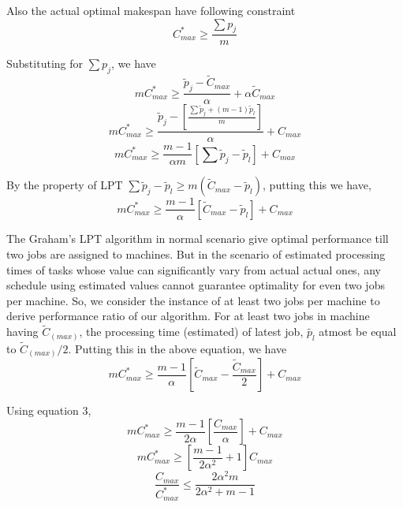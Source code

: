 \documentclass[10pt, conference, compsocconf]{IEEEtran}
\begin{document}
 Also the actual optimal makespan have following constraint
 \begin{equation}\nonumber 
C_{max}^{*}\geq \frac{\sum {p_j}}{m}
\end{equation}

Substituting for  $ \sum {p_j}$, we have
 \begin{equation}\nonumber 
 m C_{max}^{*}\geq \frac{\tilde p_j- \tilde C_{max}}{\alpha} + \alpha \tilde C_{max}
 \end{equation} 
\begin{equation}\nonumber 
 m C_{max}^{*}\geq \frac{\tilde p_j-[\frac{\sum{\tilde p_j + (m-1) \tilde p_l }}{m}]} {\alpha} + {C_{max}}
\end{equation}
\begin{equation}\nonumber
 m C_{max}^{*}\geq \frac{m-1}{\alpha m} [\sum \tilde p_j-\tilde p_l] + {C_{max}}
 \end{equation}

By the property of LPT $\sum \tilde p_j-\tilde p_l \geq m (\tilde C_{max}-\tilde p_l)$, putting this we have,\\
\begin{equation}\nonumber 
 m C_{max}^{*}\geq \frac{m-1}{\alpha } \left[\tilde C_{max}-\tilde p_l\right] + {C_{max}}
 \end{equation}
 
 The Graham’s LPT algorithm in normal scenario give
 optimal performance till two jobs are assigned to machines.
 But in the scenario of estimated processing times
 of tasks whose value can significantly vary from actual
 actual ones, any schedule using estimated values cannot
 guarantee optimality for even two jobs per machine. So,
 we consider the instance of at least two jobs per machine
 to derive performance ratio of our algorithm. For at least
 two jobs in machine having $\tilde{C}_(max)$, the processing time
 (estimated) of latest job, $\tilde{p_l} $ atmost be equal to $\tilde{C}_(max)/2$. Putting this in the above equation, we have
\begin{equation}\nonumber
 m C_{max}^{*}\geq \frac{m-1}{\alpha } \left[\tilde C_{max}-\frac{\tilde C_{max}}{2}\right] + {C_{max}}
\end{equation}

Using equation 3,
\begin{equation}\nonumber
 m C_{max}^{*}\geq \frac{m-1}{2\alpha } \left[\frac{C_{max}} {\alpha} \right]+ {C_{max}}
\end{equation}
\begin{equation}\nonumber
 m C_{max}^{*}\geq \left[\frac{m-1}{2\alpha^{2} } +1\right]{C_{max}}
\end{equation}
\begin{equation}\nonumber
\frac{C_{max}}{C_{max}^{*}}\leq \frac{2\alpha^{2}m}{2\alpha^{2}+ m-1}
\end{equation}
\end{document}
